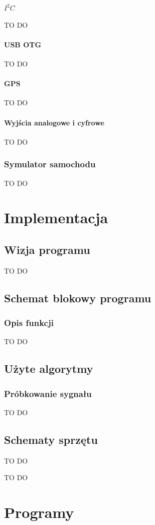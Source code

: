 \documentclass{xmgr}
\begin{document}
\subsubsection{$I^2C$}
TO DO
\subsubsection{USB OTG}
TO DO
\subsubsection{GPS}
TO DO
\subsubsection{Wyjścia analogowe i cyfrowe}
TO DO
\subsection{Symulator samochodu}
TO DO

\chapter{Implementacja}
\section{Wizja programu}
TO DO
\section{Schemat blokowy programu}
\subsection{Opis funkcji}
TO DO
\section{Użyte algorytmy}
\subsection{Próbkowanie sygnału}
TO DO
\section{Schematy sprzętu}
TO DO

\summary
TO DO

\appendix
\chapter{Programy}




\listoftables

\listoffigures

\oswiadczenie
\end{document}
